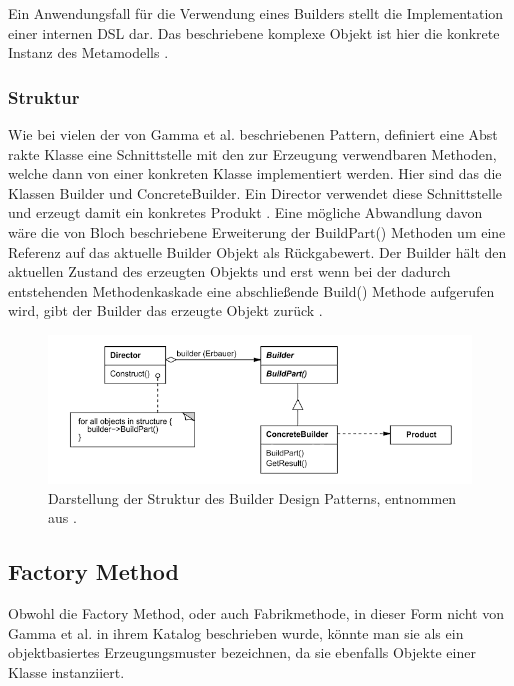 \documentclass[12pt,oneside,a4paper,parskip]{scrbook}
\begin{document}
Ein Anwendungsfall für die Verwendung eines Builders stellt die Implementation einer internen DSL dar. Das beschriebene komplexe Objekt ist hier die konkrete Instanz des Metamodells \cite[S. 343ff.]{fowler2010}.

\subsubsection{Struktur}

Wie bei vielen der von Gamma et al. beschriebenen Pattern, definiert eine Abst rakte Klasse eine Schnittstelle mit den zur Erzeugung verwendbaren Methoden, welche dann von einer konkreten Klasse implementiert werden. Hier sind das die Klassen Builder und ConcreteBuilder. Ein Director verwendet diese Schnittstelle und erzeugt damit ein konkretes Produkt \cite[S. 162f.]{gamma2015}. Eine mögliche Abwandlung davon wäre die von Bloch beschriebene Erweiterung der BuildPart() Methoden um eine Referenz auf das aktuelle Builder Objekt als Rückgabewert. Der Builder hält den aktuellen Zustand des erzeugten Objekts und erst wenn bei der dadurch entstehenden Methodenkaskade eine abschließende Build() Methode aufgerufen wird, gibt der Builder das erzeugte Objekt zurück \cite[S. 13ff]{bloch2017}.

\begin{figure}[htbp]
	\centering
	\includegraphics[width=1.0\textwidth]{bilder/builder}
	\caption{Darstellung der Struktur des Builder Design Patterns, entnommen aus \cite[S. 162]{gamma2015}.}
	\label{fig:builder}
\end{figure}

\subsection{Factory Method}

Obwohl die Factory Method, oder auch Fabrikmethode, in dieser Form nicht von Gamma et al. in ihrem Katalog beschrieben wurde, könnte man sie als ein objektbasiertes Erzeugungsmuster bezeichnen, da sie ebenfalls Objekte einer Klasse instanziiert.
\end{document}
